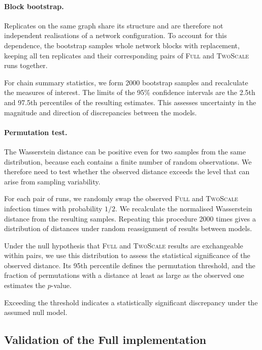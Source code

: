 \documentclass[a4paper,fleqn]{cas-sc}
\newcommand{\Full}{\textup{\textsc{Full}}}
\newcommand{\TS}{\textup{\textsc{TwoScale}}}
\begin{document}
\paragraph{Block bootstrap.}
Replicates on the same graph share its structure and are therefore not independent realisations of a network configuration. To account for this dependence, the bootstrap samples whole network blocks with replacement, keeping all ten replicates and their corresponding pairs of \Full{} and \TS{} runs together.

For chain summary statistics, we form 2000 bootstrap samples and recalculate the measures of interest. The limits of the 95\% confidence intervals are the 2.5th and 97.5th percentiles of the resulting estimates. This assesses uncertainty in the magnitude and direction of discrepancies between the models.

\paragraph{Permutation test.}
The Wasserstein distance can be positive even for two samples from the same distribution, because each contains a finite number of random observations. We therefore need to test whether the observed distance exceeds the level that can arise from sampling variability.

For each pair of runs, we randomly swap the observed \Full{} and \TS{} infection times with probability $1/2$. We recalculate the normalised Wasserstein distance from the resulting samples. Repeating this procedure 2000 times gives a distribution of distances under random reassignment of results between models.

Under the null hypothesis that \Full{} and \TS{} results are exchangeable within pairs, we use this distribution to assess the statistical significance of the observed distance. Its 95th percentile defines the permutation threshold, and the fraction of permutations with a distance at least as large as the observed one estimates the $p$-value.

Exceeding the threshold indicates a statistically significant discrepancy under the assumed null model.

\subsection{Validation of the Full implementation}
\end{document}
